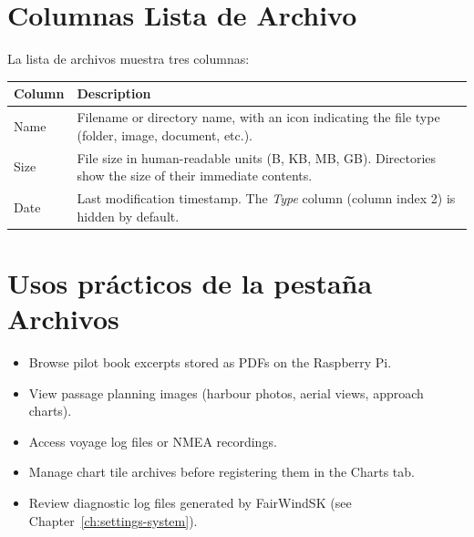\section{Columnas Lista de Archivo}

La lista de archivos muestra tres columnas:

\begin{longtable}{L{2cm} L{11.7cm}}
\toprule
{}
{\sffamily\bfseries\color{white} Column} &
{\sffamily\bfseries\color{white} Description} \\
\midrule
Name & Filename or directory name, with an icon indicating the file type (folder, image, document, etc.). \\
Size & File size in human-readable units (B, KB, MB, GB). Directories show the size of their immediate contents. \\
Date & Last modification timestamp. The \textit{Type} column (column index 2) is hidden by default. \\
\bottomrule
\end{longtable}

\section{Usos prácticos de la pestaña Archivos}

\begin{itemize}
  \item Browse pilot book excerpts stored as PDFs on the Raspberry Pi.
  \item View passage planning images (harbour photos, aerial views, approach charts).
  \item Access voyage log files or NMEA recordings.
  \item Manage chart tile archives before registering them in the Charts tab.
  \item Review diagnostic log files generated by FairWindSK (see Chapter~\ref{ch:settings-system}).
\end{itemize}
